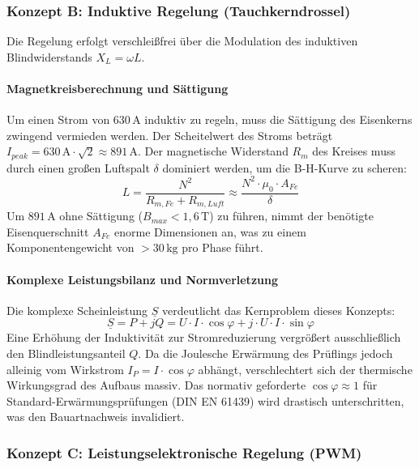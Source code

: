 \subsubsection{Konzept B: Induktive Regelung (Tauchkerndrossel)}

Die Regelung erfolgt verschleißfrei über die Modulation des induktiven Blindwiderstands $X_L = \omega L$.

\paragraph{Magnetkreisberechnung und Sättigung}
Um einen Strom von 630\,A induktiv zu regeln, muss die Sättigung des Eisenkerns zwingend vermieden werden. Der Scheitelwert des Stroms beträgt $I_{peak} = 630\,\text{A} \cdot \sqrt{2} \approx 891\,\text{A}$. Der magnetische Widerstand $R_m$ des Kreises muss durch einen großen Luftspalt $\delta$ dominiert werden, um die B-H-Kurve zu scheren:
\begin{equation}
    L = \frac{N^2}{R_{m,Fe} + R_{m,Luft}} \approx \frac{N^2 \cdot \mu_0 \cdot A_{Fe}}{\delta}
\end{equation}
Um $891\,\text{A}$ ohne Sättigung ($B_{max} < 1,6\,\text{T}$) zu führen, nimmt der benötigte Eisenquerschnitt $A_{Fe}$ enorme Dimensionen an, was zu einem Komponentengewicht von $> 30\,\text{kg}$ pro Phase führt.

\paragraph{Komplexe Leistungsbilanz und Normverletzung}
Die komplexe Scheinleistung $\underline{S}$ verdeutlicht das Kernproblem dieses Konzepts:
\begin{equation}
    \underline{S} = P + jQ = U \cdot I \cdot \cos\varphi + j \cdot U \cdot I \cdot \sin\varphi
\end{equation}
Eine Erhöhung der Induktivität zur Stromreduzierung vergrößert ausschließlich den Blindleistungsanteil $Q$. Da die Joulesche Erwärmung des Prüflings jedoch alleinig vom Wirkstrom $I_P = I \cdot \cos\varphi$ abhängt, verschlechtert sich der thermische Wirkungsgrad des Aufbaus massiv. Das normativ geforderte $\cos\varphi \approx 1$ für Standard-Erwärmungsprüfungen (DIN EN 61439) wird drastisch unterschritten, was den Bauartnachweis invalidiert.


\subsubsection{Konzept C: Leistungselektronische Regelung (PWM)}

